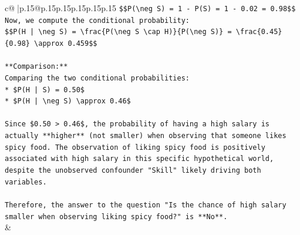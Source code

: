 \documentclass{article}
\begin{document}
{\begin{supertabular}{c@{$\;$}|p{.15\linewidth}@{}p{.15\linewidth}p{.15\linewidth}p{.15\linewidth}p{.15\linewidth}p{.15\linewidth}}
{{{\texttt{\$\$P(\textbackslash{}neg S) = 1 {-} P(S) = 1 {-} 0.02 = 0.98\$\$} \\
\texttt{Now, we compute the conditional probability:} \\
\texttt{\$\$P(H | \textbackslash{}neg S) = \textbackslash{}frac\{P(\textbackslash{}neg S \textbackslash{}cap H)\}\{P(\textbackslash{}neg S)\} = \textbackslash{}frac\{0.45\}\{0.98\} \textbackslash{}approx 0.459\$\$} \\
\\ 
\texttt{**Comparison:**} \\
\texttt{Comparing the two conditional probabilities:} \\
\texttt{*   \$P(H | S) = 0.50\$} \\
\texttt{*   \$P(H | \textbackslash{}neg S) \textbackslash{}approx 0.46\$} \\
\\ 
\texttt{Since \$0.50 > 0.46\$, the probability of having a high salary is actually **higher** (not smaller) when observing that someone likes spicy food. The observation of liking spicy food is positively associated with high salary in this specific hypothetical world, despite the unobserved confounder "Skill" likely driving both variables.} \\
\\ 
\texttt{Therefore, the answer to the question "Is the chance of high salary smaller when observing liking spicy food?" is **No**.} \\
            }
        }
    }
    & \\ \\


\end{supertabular}}
\end{document}

